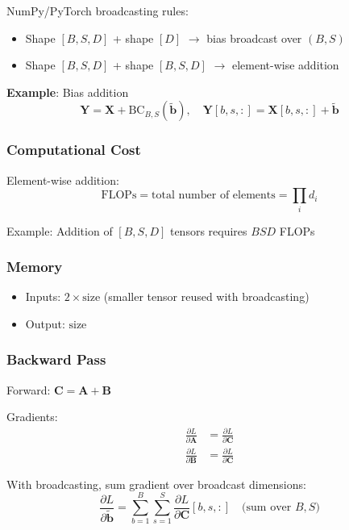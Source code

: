 \documentclass[10pt]{article}
\begin{document}
NumPy/PyTorch broadcasting rules:
\begin{itemize}
  \item Shape $[B,S,D]$ + shape $[D]$ $\rightarrow$ bias broadcast over $(B,S)$
  \item Shape $[B,S,D]$ + shape $[B,S,D]$ $\rightarrow$ element-wise addition
\end{itemize}

\textbf{Example}: Bias addition
\begin{equation}
\mathbf{Y} = \mathbf{X} + \mathrm{BC}_{B,S}(\tilde{\mathbf{b}}), \quad \mathbf{Y}[b,s,:] = \mathbf{X}[b,s,:] + \tilde{\mathbf{b}}
\end{equation}

\subsubsection{Computational Cost}

Element-wise addition:
\begin{equation}
\text{FLOPs} = \text{total number of elements} = \prod_i d_i
\end{equation}

Example: Addition of $[B,S,D]$ tensors requires $BSD$ FLOPs

\subsubsection{Memory}

\begin{itemize}
  \item Inputs: $2 \times \text{size}$ (smaller tensor reused with broadcasting)
  \item Output: $\text{size}$
\end{itemize}

\subsubsection{Backward Pass}

Forward: $\mathbf{C} = \mathbf{A} + \mathbf{B}$

Gradients:
\begin{align}
\frac{\partial L}{\partial \mathbf{A}} &= \frac{\partial L}{\partial \mathbf{C}} \\
\frac{\partial L}{\partial \mathbf{B}} &= \frac{\partial L}{\partial \mathbf{C}}
\end{align}

With broadcasting, sum gradient over broadcast dimensions:
\begin{equation}
\frac{\partial L}{\partial \tilde{\mathbf{b}}} = \sum_{b=1}^{B} \sum_{s=1}^{S} \frac{\partial L}{\partial \mathbf{C}}[b,s,:] \quad \text{(sum over } B, S\text{)}
\end{equation}
\end{document}
